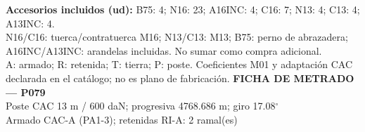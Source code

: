 \begingroup\scriptsize
\textbf{Accesorios incluidos (ud):} B75: 4; N16: 23; A16INC: 4; C16: 7; N13: 4; C13: 4; A13INC: 4.\\
N16/C16: tuerca/contratuerca M16; N13/C13: M13; B75: perno de abrazadera; A16INC/A13INC: arandelas incluidas. No sumar como compra adicional.\\
A: armado; R: retenida; T: tierra; P: poste. Coeficientes M01 y adaptación CAC declarada en el catálogo; no es plano de fabricación.
\endgroup\endgroup
\clearpage{}
\begingroup\small\setlength{\parskip}{3pt}\renewcommand{\arraystretch}{1.05}
\textbf{\large FICHA DE METRADO — P079}\\[4pt]
Poste CAC 13 m / 600 daN; progresiva 4768.686 m; giro 17.08\ensuremath{^\circ}\\
Armado CAC-A (PA1-3); retenidas RI-A: 2 ramal(es)\\
\begingroup\scriptsize
